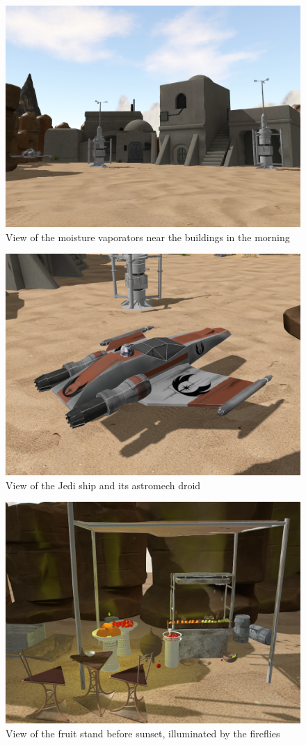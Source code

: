 \begin{figure}
    \centering
    \includegraphics[width=.75\linewidth]{img/building.png}
    \caption{View of the moisture vaporators near the buildings in the morning}
    \label{fig:building}
\end{figure}

\begin{figure}
    \centering
    \includegraphics[width=.75\linewidth]{img/ship.png}
    \caption{View of the Jedi ship and its astromech droid}
    \label{fig:ship}
\end{figure}

\begin{figure}
    \centering
    \includegraphics[width=.75\linewidth]{img/fruit_stand.png}
    \caption{View of the fruit stand before sunset, illuminated by the fireflies}
    \label{fig:fruit_stand}
\end{figure}

